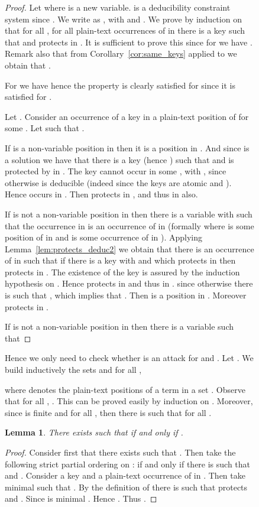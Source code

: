 \documentclass[acmtocl,acmnow]{acmtrans2m}
\newtheorem{lemma}[theorem]{Lemma}
\newcommand{\dedsys}[1]{deducibility constraint system}
\begin{document}
\begin{figure}[t]
{{\begin{proof}
Let  where  is a new variable.  is a 
\dedsys{} since
.
We write  as , with  and .
We prove by induction on  that for all , for all plain-text occurrences  of  in  there is a key
 such that  and  protects  in . It is sufficient to prove this since for  we have .
Remark also that from Corollary~\ref{cor:same_keys} applied to  we obtain that
.

For  we have  hence the property is clearly satisfied for  since it is
satisfied for .

Let . Consider an occurrence  of a key  in a plain-text position of 
for some . Let  such that .

If  is a non-variable position in  then it is a position in .
And since  is a solution we have that there is a key  (hence )
such that  and  is protected by  in . The key  cannot occur  in some , with
, since otherwise  is deducible (indeed  since the keys are atomic and
). Hence  occurs in . Then  protects  in , and thus in  also.


If  is not a non-variable position in  then there is a variable  with  such that
the occurrence  in  is an occurrence of  in 
(formally  where  is some position of  in  and  is some occurrence of  in ).
Applying Lemma~\ref{lem:protects_deduc2} we obtain that there is an occurrence  of  in
 such that if there is a key  with  and
which protects  in  then  protects  in . The existence of the
key  is assured by the induction hypothesis on . Hence  protects  in  
and thus  in .
since otherwise there is  such that , which implies that
. Then  is a position in . Moreover  protects  in
.

If  is not a non-variable position in  then there is a variable  such that
\end{proof}





Hence we only need to check whether  is an attack for  and . Let 
. We build inductively the sets  and for all
,

where  denotes the plain-text positions of a term  in a set .
Observe that for all , . This can be proved easily by induction on . Moreover, since  is finite and  for all ,
then there is  such that  for all .

\begin{lemma}
There exists  such that  if and only if .
\end{lemma}
\begin{proof}
Consider first that there exists  such that . Then take the following strict partial ordering on
:  if and only if there is  such that  and . Consider a key
 and a plain-text occurrence  of  in . Then take  minimal such that
. By the definition of  there is  such that  protects  and .
Since  is minimal . Hence . Thus . 


\end{proof}}}
\end{figure}
\end{document}
